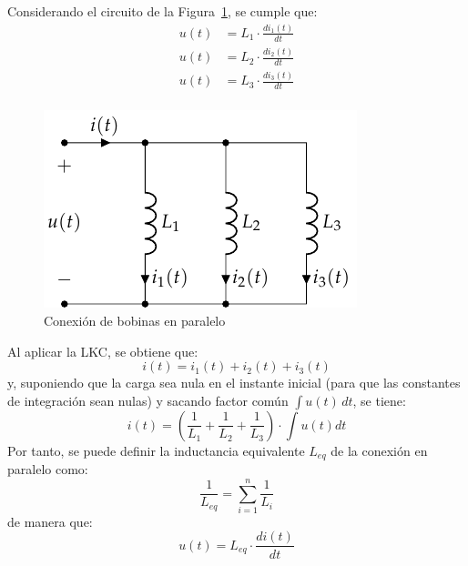 		Considerando el circuito de la
                Figura~\ref{fig:bobinas-paralelo}, se cumple que:
		\begin{align*}
                  u(t) &= L_1 \cdot \frac{di_1(t)}{dt}\\
                  u(t) &= L_2 \cdot \frac{di_2(t)}{dt}\\
                  u(t) &= L_3 \cdot \frac{di_3(t)}{dt}\\
		\end{align*}
		\begin{figure}[H]
                  \centering
                  \includegraphics[width=0.35\linewidth]{../figs/BobinasParalelo.pdf}
                  \caption{Conexión de bobinas en paralelo}
                  \label{fig:bobinas-paralelo}
		\end{figure}
		Al aplicar la LKC, se obtiene que:
		\begin{equation*}
                  i(t) = i_1(t) + i_2(t) + i_3(t)
		\end{equation*}
		y, suponiendo que la carga sea nula en el instante
                inicial (para que las constantes de integración sean
                nulas) y sacando factor común $\int u(t)\,dt$, se
                tiene:
		\begin{equation*}
                  i(t)=\left(\dfrac{1}{L_1}+\dfrac{1}{L_2}+\dfrac{1}{L_3} \right)\cdot \int u(t) dt
		\end{equation*}
		Por tanto, se puede definir la inductancia equivalente
                $L_{eq}$ de la conexión en paralelo como:
		\begin{equation}
                  \boxed{\dfrac{1}{L_{eq}} = \sum_{i = 1}^n \dfrac{1}{L_i}}
		\end{equation}
		de manera que:
		\begin{equation*}
                  u(t) = L_{eq} \cdot \dfrac{di(t)}{dt}
		\end{equation*}
